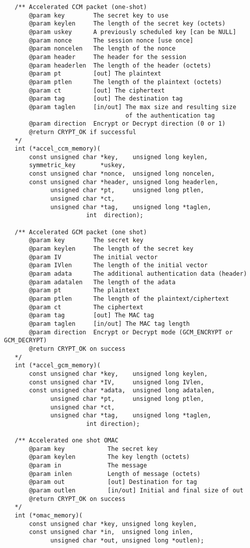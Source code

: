 \documentclass[synpaper]{book}
\begin{document}
\begin{small}
\begin{verbatim}
   /** Accelerated CCM packet (one-shot)
       @param key        The secret key to use
       @param keylen     The length of the secret key (octets)
       @param uskey      A previously scheduled key [can be NULL]
       @param nonce      The session nonce [use once]
       @param noncelen   The length of the nonce
       @param header     The header for the session
       @param headerlen  The length of the header (octets)
       @param pt         [out] The plaintext
       @param ptlen      The length of the plaintext (octets)
       @param ct         [out] The ciphertext
       @param tag        [out] The destination tag
       @param taglen     [in/out] The max size and resulting size 
                                  of the authentication tag
       @param direction  Encrypt or Decrypt direction (0 or 1)
       @return CRYPT_OK if successful
   */
   int (*accel_ccm_memory)(
       const unsigned char *key,    unsigned long keylen,
       symmetric_key       *uskey,
       const unsigned char *nonce,  unsigned long noncelen,
       const unsigned char *header, unsigned long headerlen,
             unsigned char *pt,     unsigned long ptlen,
             unsigned char *ct,
             unsigned char *tag,    unsigned long *taglen,
                       int  direction);

   /** Accelerated GCM packet (one shot)
       @param key        The secret key
       @param keylen     The length of the secret key
       @param IV         The initial vector 
       @param IVlen      The length of the initial vector
       @param adata      The additional authentication data (header)
       @param adatalen   The length of the adata
       @param pt         The plaintext
       @param ptlen      The length of the plaintext/ciphertext
       @param ct         The ciphertext
       @param tag        [out] The MAC tag
       @param taglen     [in/out] The MAC tag length
       @param direction  Encrypt or Decrypt mode (GCM_ENCRYPT or GCM_DECRYPT)
       @return CRYPT_OK on success
   */
   int (*accel_gcm_memory)(
       const unsigned char *key,    unsigned long keylen,
       const unsigned char *IV,     unsigned long IVlen,
       const unsigned char *adata,  unsigned long adatalen,
             unsigned char *pt,     unsigned long ptlen,
             unsigned char *ct, 
             unsigned char *tag,    unsigned long *taglen,
                       int direction);

   /** Accelerated one shot OMAC 
       @param key            The secret key
       @param keylen         The key length (octets) 
       @param in             The message 
       @param inlen          Length of message (octets)
       @param out            [out] Destination for tag
       @param outlen         [in/out] Initial and final size of out
       @return CRYPT_OK on success
   */
   int (*omac_memory)(
       const unsigned char *key, unsigned long keylen,
       const unsigned char *in,  unsigned long inlen,
             unsigned char *out, unsigned long *outlen);


\end{verbatim}
\end{small}
\end{document}
